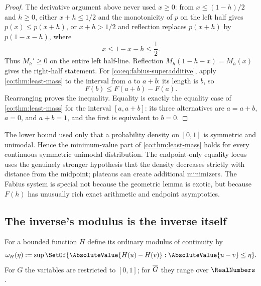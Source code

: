 \begin{proof}
The derivative argument above never used $x\ge0$: from
$x\le(1-h)/2$ and $h\ge0$, either $x+h\le1/2$ and the monotonicity of $p$ on
the left half gives $p(x)\le p(x+h)$, or $x+h>1/2$ and reflection replaces
$p(x+h)$ by $p(1-x-h)$, where
\[
 x\le1-x-h\le\frac12.
\]
Thus $M_h'\ge0$ on the entire left half-line.  Reflection
$M_h(1-h-x)=M_h(x)$ gives the right-half statement.  For
\eqref{co:eq:fabius-superadditive}, apply \cref{co:thm:least-mass} to the interval
from $a$ to $a+b$: its length is $b$, so
\[
 F(b)\le F(a+b)-F(a).
\]
 Rearranging proves the inequality.  Equality is exactly the equality case of
 \cref{co:thm:least-mass} for the interval $[a,a+b]$: its three alternatives are
 $a=a+b$, $a=0$, and $a+b=1$, and the first is equivalent to $b=0$.
\end{proof}

\begin{remark}\label{co:rem:general-principle}
The lower bound used only that a probability density on $[0,1]$ is symmetric
and unimodal.  Hence the minimum-value part of \cref{co:thm:least-mass} holds for
every continuous symmetric unimodal distribution.  The endpoint-only equality
locus uses the genuinely stronger hypothesis that the density decreases
strictly with distance from the midpoint; plateaus can create additional
minimizers.  The Fabius system is special not because the geometric lemma is
exotic, but because $F(h)$ has unusually rich exact arithmetic and endpoint
asymptotics.
\end{remark}

\subsection{The inverse's modulus is the inverse itself}

For a bounded function $H$ define its ordinary modulus of continuity by
\begin{equation}\label{co:eq:ordinary-modulus}
 \omega_H(\eta):=
 \sup\SetOf{\AbsoluteValue{H(u)-H(v)}:\AbsoluteValue{u-v}\le\eta}.
\end{equation}
For $G$ the variables are restricted to $[0,1]$; for $\overline G$ they range over
$\RealNumbers$.

